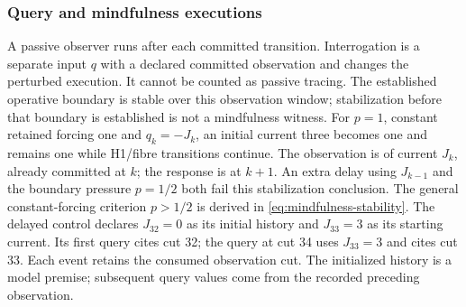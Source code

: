 \subsubsection{Query and mindfulness executions}
\label{manual:m2-query-mindfulness}
A passive observer runs after each committed transition. Interrogation is a
separate input \(q\) with a declared committed observation and changes the
perturbed execution. It cannot be counted as passive tracing.
The established operative boundary is stable over this observation window;
stabilization before that boundary is established is not a mindfulness witness.
For \(p=1\), constant retained forcing one and \(q_k=-J_k\), an initial
current three becomes one and remains one while H1/fibre transitions continue.
The observation is of current \(J_k\), already committed at \(k\); the response
is at \(k+1\). An extra delay using \(J_{k-1}\) and the boundary pressure
\(p=1/2\) both fail this stabilization conclusion. The general constant-forcing
criterion \(p>1/2\) is derived in \eqref{eq:mindfulness-stability}.
The delayed control declares \(J_{32}=0\) as its initial history and
\(J_{33}=3\) as its starting current. Its first query cites cut 32;
the query at cut 34 uses \(J_{33}=3\) and cites cut 33. Each event retains
the consumed observation cut. The initialized history is a model premise;
subsequent query values come from the recorded preceding observation.

